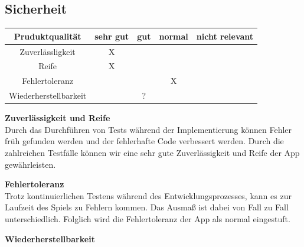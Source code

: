 \documentclass[parskip=full]{scrartcl}
\begin{document}
\subsection{Sicherheit}
\begin{tabular}{| c | c | c | c | c |}
    \hline
    \textbf{Pruduktqualität} & \textbf{sehr gut} & \textbf{gut} & \textbf{normal} & \textbf{nicht relevant} \\ \hline
    Zuverlässligkeit         & X                 &              &                 &                         \\ \hline
    Reife                    & X                 &              &                 &                         \\ \hline
    Fehlertoleranz           &                   &              & X               &                         \\ \hline
    Wiederherstellbarkeit    &                   & ?            &                 &                         \\ \hline
\end{tabular}

\textbf{Zuverlässigkeit und Reife}\\
Durch das Durchführen von Tests während der Implementierung können Fehler früh gefunden werden und der fehlerhafte Code verbessert werden.
Durch die zahlreichen Testfälle können wir eine sehr gute Zuverlässigkeit und Reife der App gewährleisten.

\textbf{Fehlertoleranz}\\
Trotz kontinuierlichen Testens während des Entwicklungsprozesses, kann es zur Laufzeit des Spiels zu Fehlern kommen.
Das Ausmaß ist dabei von Fall zu Fall unterschiedlich.
Folglich wird die Fehlertoleranz der App als normal eingestuft.

\textbf{Wiederherstellbarkeit}
\end{document}
